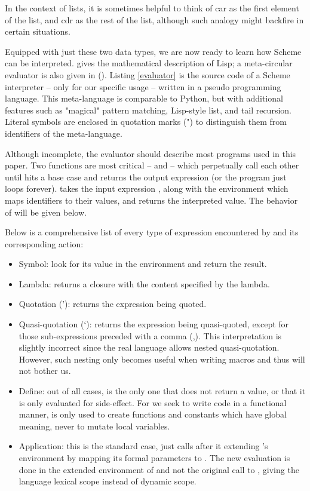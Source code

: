 In the context of lists, it is sometimes helpful to think of car as the first element of the list, and cdr as the rest of the list, although such analogy might backfire in certain situations.

Equipped with just these two data types, we are now ready to learn how Scheme can be interpreted. \textcite{lisp} gives the mathematical description of Lisp; a meta-circular evaluator is also given in (\textcite{lisp-man}).
Listing \ref{evaluator} is the source code of a Scheme interpreter -- only for our specific usage -- written in a pseudo programming language. This meta-language is comparable to Python, but with additional features such as "magical" pattern matching, Lisp-style list, and tail recursion. Literal symbols are enclosed in quotation marks (") to distinguish them from identifiers of the meta-language.

Although incomplete, the evaluator should describe most programs used in this paper. Two functions are most critical --  and  -- which perpetually call each other until  hits a base case and returns the output expression (or the program just loops forever).  takes the input expression , along with the environment  which maps identifiers to their values, and returns the interpreted value. The behavior of  will be given below.


Below is a comprehensive list of every type of expression encountered by  and its corresponding action:
\begin{itemize}
\item Symbol: look for its value in the environment and return the result.
\item Lambda: returns a closure with the content specified by the lambda.
\item Quotation ('): returns the expression being quoted.
\item Quasi-quotation (`): returns the expression being quasi-quoted, except for those sub-expressions preceded with a comma (,). This interpretation is slightly incorrect since the real language allows nested quasi-quotation. However, such nesting only becomes useful when writing macros and thus will not bother us.
\item Define: out of all cases,  is the only one that does not return a value, or that it is only evaluated for side-effect. For we seek to write code in a functional manner,   is only used to create functions and constants which have global meaning, never to mutate local variables. 
\item Application: this is the standard case,  just calls  after it extending 's environment by mapping its formal parameters to . The new evaluation is done in the extended environment of  and not the original call to , giving the language lexical scope instead of dynamic scope.
\end{itemize}

